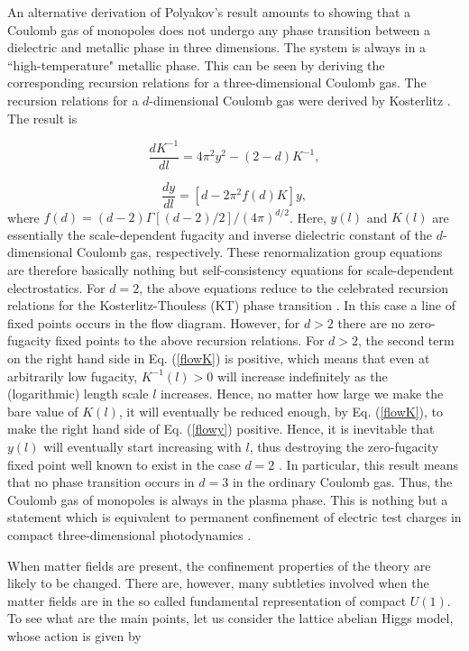 \documentclass[a4paper,showpacs,preprintnumbers,amsmath,amssymb,prl,twocolumn]{revtex4}
\begin{document}
An alternative derivation of Polyakov's result amounts to showing that a 
Coulomb gas of monopoles does not undergo any phase transition between a 
dielectric and metallic phase in three dimensions.  The system is always 
in a ``high-temperature" metallic phase. This can be seen by deriving the 
corresponding recursion relations for a three-dimensional Coulomb gas. The 
recursion relations for a $d$-dimensional Coulomb gas were derived by 
Kosterlitz \cite{Kosterlitz}. The result is

\begin{equation}
\label{flowK}
\frac{d K^{-1}}{dl}=4\pi^2 y^2-(2-d)K^{-1},
\end{equation}

\begin{equation}
\label{flowy}
\frac{dy}{dl}=\left[d-2\pi^2f(d)K\right]y,
\end{equation}
where $f(d)=(d-2)\Gamma[(d-2)/2]/(4\pi)^{d/2}$. 
Here, $y(l)$ and $K(l)$ are essentially the scale-dependent fugacity and 
inverse dielectric constant of the $d$-dimensional Coulomb gas, respectively. 
These renormalization group equations are therefore basically 
nothing but self-consistency equations for scale-dependent electrostatics. For 
$d=2$, the above equations reduce to the celebrated recursion relations for 
the Kosterlitz-Thouless (KT) phase transition \cite{KT}. In this case a line 
of fixed points occurs in the flow diagram. However, for $d > 2$ there are 
no zero-fugacity fixed points to the above recursion relations. For $d > 2$, 
the second term  on the right hand side in Eq. (\ref{flowK}) is positive, 
which means that even at arbitrarily low fugacity, $K^{-1}(l) > 0$ will 
increase indefinitely as the (logarithmic) length scale $l$ increases. Hence, 
no matter how large we make the bare value of $K(l)$, it will eventually be 
reduced enough, by Eq. (\ref{flowK}), to make the right hand side of Eq. 
(\ref{flowy}) positive. Hence, it is inevitable that $y(l)$ will eventually 
start increasing with $l$, thus destroying the zero-fugacity fixed point well 
known to exist in the case $d=2$ \cite{KT}.  In particular, this result means 
that no phase transition occurs in $d=3$ in the ordinary Coulomb gas. 
Thus, the Coulomb gas of monopoles is always in the plasma phase. This 
is nothing but a statement which is equivalent to permanent confinement 
of electric test charges in compact three-dimensional photodynamics 
\cite{Polyakov}.

When matter fields are present, the confinement properties 
of the theory are likely to be changed. There are, however, 
many subtleties involved when the matter fields are in 
the so called fundamental representation of compact $U(1)$. 
To see what are the main points, let us consider the lattice 
abelian Higgs model, whose action is given by
\end{document}
